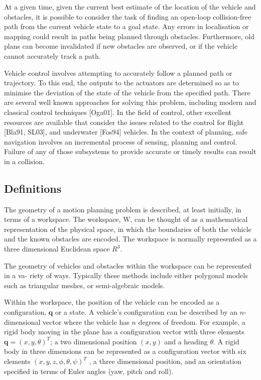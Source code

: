 At a given time, given the current best estimate of the location of the vehicle and obstacles,
it is possible to consider the task of finding an open-loop collision-free path from the current
vehicle state to a goal state. Any errors in localisation or mapping could result in paths being
planned through obstacles. Furthermore, old plans can become invalidated if new obstacles
are observed, or if the vehicle cannot accurately track a path.

Vehicle control involves attempting to accurately follow a planned path or trajectory. To
this end, the outputs to the actuators are determined so as to minimise the deviation of the
state of the vehicle from the specified path. There are several well known approaches for
solving this problem, including modern and classical control techniques [Oga01]. In the field
of control, other excellent resources are available that consider the issues related to the control
for flight [Bla91, SL03], and underwater [Fos94] vehicles.
In the context of planning, safe navigation involves an incremental process of sensing,
planning and control. Failure of any of those subsystems to provide accurate or timely results
can result in a collision.


\subsection{Definitions}

The geometry of a motion planning problem is described, at least initially, in terms of a
workspace. The workspace, W, can be thought of as a mathematical representation of the
physical space, in which the boundaries of both the vehicle and the known obstacles are encoded. 
The workspace is normally represented as a three dimensional Euclidean space $R^3$.

The geometry of vehicles and obstacles within the workspace can be represented in a va-
riety of ways. Typically these methods include either polygonal models such as triangular
meshes, or semi-algebraic models.


Within the workspace, the position of the vehicle can be encoded as a configuration, $\mathbf{q}$ or a state. A
vehicle’s configuration can be described by an $n$-dimensional vector where the vehicle has $n$
degrees of freedom. For example, a rigid body moving in the plane has a configuration vector
with three elements $\mathbf{q} = (x, y, \theta)^T$;  a two dimensional position $(x,y)$ and a heading $\theta$.
A rigid body in three dimensions can be represented as a configuration vector with six elements $(x, y, z, \phi, \theta, \psi)^T$ , a
three dimensional position, and an orientation specified in terms of Euler angles (yaw, pitch and roll).

